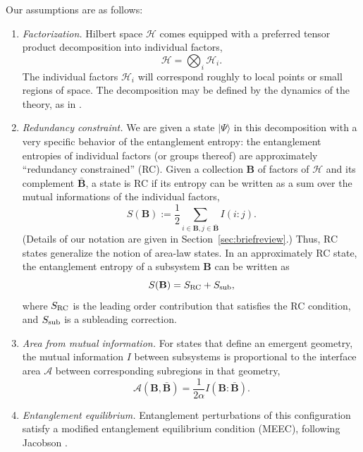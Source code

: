 \documentclass[%
preprint,
nofootinbib,
amsmath,amssymb,
aps,
prd,
showpacs,
superscriptaddress
]{revtex4-1}
\newcommand{\area}{\mathcal{A}}
\DeclareMathOperator{\co}{:}
\begin{document}
Our assumptions are as follows:
\begin{enumerate}[label=\textnormal{(A\arabic*)}]
\item \emph{Factorization.} Hilbert space $\mathcal{H}$ comes equipped with a preferred tensor product decomposition into individual factors,
 \begin{equation}
 \mathcal{H}=\bigotimes_i \mathcal{H}_i.
 \label{eqn:tensordecomp}
 \end{equation} 
 The individual factors $\mathcal{H}_i$ will correspond roughly to local points or small regions of space.
 The decomposition may be defined by the dynamics of the theory, as in \cite{Cotler:2017abq}.
 \label{itm:1}
\item \emph{Redundancy constraint.} We are given a state $|\Psi\rangle$ in this decomposition with a very specific behavior of the entanglement entropy: the entanglement entropies of individual factors (or groups thereof) are approximately ``redundancy constrained'' (RC). 
Given a collection $\textbf{B}$ of factors of $\mathcal{H}$ and its complement $\bar{\textbf{B}}$, a state is RC if its entropy can be written as a sum over the mutual informations of the individual factors,
  \begin{equation}
  S(\textbf{B}):=\frac 1 2 \sum_{i\in\textbf{B},j\in\bar{\textbf{B}}} I(i\co j).
 \label{eqn:RC}
 \end{equation}
 (Details of our notation are given in Section~\ref{sec:briefreview}.)
 Thus, RC states generalize the notion of area-law states.
 In an approximately RC state, the entanglement entropy of a subsystem $\mathbf{B}$ can be written as 
 \begin{equation}
 S(\mathbf{B}) = S_{\rm RC} +S_{\rm sub},
 \label{eqn:approxRC}
 \end{equation}
 where $S_{\rm RC}$ is the leading order contribution that satisfies the RC condition, and $S_{\rm sub}$ is a subleading correction. \label{itm:2}
\item \emph{Area from mutual information.} For states that define an emergent geometry, the mutual information $I$ between subsystems is proportional to the interface area $\area$ between corresponding subregions in that geometry, \label{itm:3}
\begin{equation}
 {\area}(\mathbf{B}, \bar{\mathbf{B}}) = \frac{1}{2\alpha} I(\mathbf{B} \co  \bar{\mathbf{B}}).
\end{equation}
 \item \emph{Entanglement equilibrium.} Entanglement perturbations of this configuration satisfy a modified entanglement equilibrium condition (MEEC), following Jacobson \cite{Jacobson:2015hqa}.

\end{enumerate}
\end{document}
